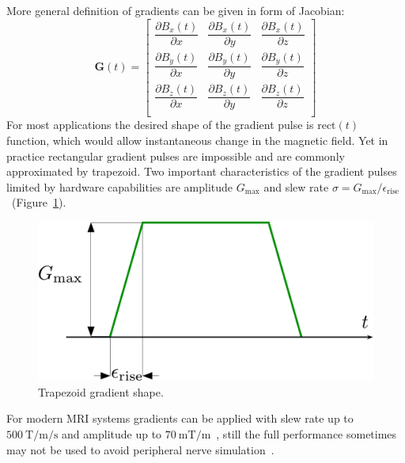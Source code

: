 More general definition of gradients can be given in form of Jacobian:
\begin{equation}\label{eq: Gradients}
	\mathbf{G}(t) = 
	\begin{bmatrix}
    \dfrac{\partial B_x(t)}{\partial x} & \dfrac{\partial B_x(t)}{\partial y} & \dfrac{\partial B_x(t)}{\partial z}\\[8pt]
    \dfrac{\partial B_y(t)}{\partial x} & \dfrac{\partial B_y(t)}{\partial y} & \dfrac{\partial B_y(t)}{\partial z}\\[8pt]
    \dfrac{\partial B_z(t)}{\partial x} & \dfrac{\partial B_z(t)}{\partial y} & \dfrac{\partial B_z(t)}{\partial z}\\
	\end{bmatrix}
\end{equation}
For most applications the desired shape of the gradient pulse is $\mathrm{rect}(t)$ function, which would allow instantaneous change in the magnetic field. 
Yet in practice rectangular gradient pulses are impossible and are commonly approximated by trapezoid. 
Two important characteristics of the gradient pulses limited by hardware capabilities are amplitude $G_{\mathrm{max}}$ and slew rate $\sigma = G_{\mathrm{max}} / \epsilon_{\mathrm{rise}}$ ~(Figure~\ref{fig: TrapGrad}).
\begin{figure}[!htb]
\vspace{+0.2cm}
\centering
\includegraphics[scale=.48]{Figures/Trapezoid.pdf}
\caption[Trapezoid gradient shape]{Trapezoid gradient shape.}
\label{fig: TrapGrad}
\end{figure}
For modern MRI systems gradients can be applied with slew rate up to $\SI{500}{\tesla / \meter / \second}$ and amplitude up to $\SI{70}{\milli\tesla / \meter}$~\cite{Tan:2020ht}, still the full performance sometimes may not be used to avoid peripheral nerve simulation~\cite{Ham:1997is}. 
